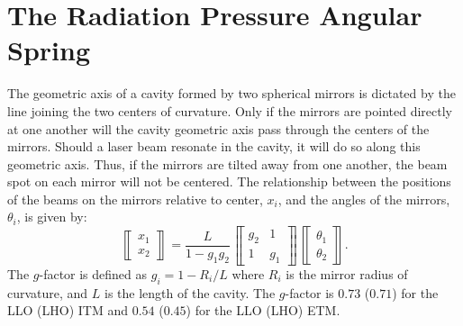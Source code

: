 \section{The Radiation Pressure Angular Spring}
The geometric axis of a cavity formed by two spherical mirrors is
dictated by the line joining the two centers of curvature. Only if the
mirrors are pointed directly at one another will the cavity geometric
axis pass through the centers of the mirrors. Should a laser beam
resonate in the cavity, it will do so along this geometric axis. Thus,
if the mirrors are tilted away from one another, the beam spot on each
mirror will not be centered. The relationship between the positions of
the beams on the mirrors relative to center, $x_i$, and the angles of
the mirrors, $\theta_i$, is given by:
\begin{equation}
\left\llbracket \begin{array}{c}
x_1\\
x_2 \end{array} \right\rrbracket = \frac{L}{1-g_1 g_2}
\left\llbracket \begin{array}{cc}
g_2 & 1\\
1 & g_1\end{array} \right\rrbracket
\left\llbracket \begin{array}{c}
\theta_1\\
\theta_2 \end{array} \right\rrbracket .
\label{eq:x}
\end{equation}
The $g$-factor is defined as $g_i=1-R_i/L$ where $R_i$ is the mirror
radius of curvature, and $L$ is the length of the cavity. The
$g$-factor is $0.73$ ($0.71$) for the LLO (LHO) ITM and $0.54$
($0.45$) for the LLO (LHO) ETM.

